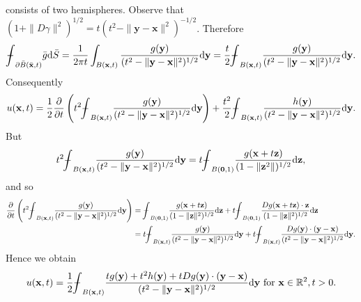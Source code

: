 \begin{sol}
  consists of two hemispheres.
  Observe that $(1+\|D\gamma\|^2)^{1/2} = t(t^2-\|\mathbf{y}-\mathbf{x}\|^2)^{-1/2}$.
  Therefore
  \begin{displaymath}
    \bbint_{\partial\bar{B}(\bar{\mathbf{x}}, t)}\bar{g}\dif\bar{S} = \frac{1}{2\pi t}
    \int_{B(\mathbf{x}, t)} \frac{g(\mathbf{y})}{(t^2-\|\mathbf{y}-\mathbf{x}\|^2)^{1/2}}\dif\mathbf{y}
    = \frac{t}{2}\bbint_{B(\mathbf{x}, t)}\frac{g(\mathbf{y})}{(t^2-\|\mathbf{y}-\mathbf{x}\|^2)^{1/2}}\dif\mathbf{y}.
  \end{displaymath}
  Consequently
  \begin{displaymath}
    u(\mathbf{x}, t) = \frac{1}{2}\frac{\partial}{\partial t}\LP t^2
    \bbint_{B(\mathbf{x}, t)}\frac{g(\mathbf{y})}{(t^2-\|\mathbf{y}-\mathbf{x}\|^2)^{1/2}}\dif\mathbf{y}\RP + \frac{t^2}{2}\bbint_{B(\mathbf{x}, t)}
    \frac{h(\mathbf{y})}{(t^2-\|\mathbf{y}-\mathbf{x}\|^2)^{1/2}}\dif\mathbf{y}.
  \end{displaymath}
  But
  \begin{displaymath}
    t^2\bbint_{B(\mathbf{x}, t)}\frac{g(\mathbf{y})}{(t^2-\|\mathbf{y}-\mathbf{x}\|^2)^{1/2}}\dif\mathbf{y}
    = t\bbint_{B(\mathbf{0}, 1)}\frac{g(\mathbf{x}+t\mathbf{z})}{(1-\|\mathbf{z}^2\|)^{1/2}}\dif\mathbf{z},
  \end{displaymath}
  and so
  \begin{align*}
    \frac{\partial}{\partial t}\LP t^2
    \bbint_{B(\mathbf{x}, t)}\frac{g(\mathbf{y})}{(t^2-\|\mathbf{y}-\mathbf{x}\|^2)^{1/2}}\dif\mathbf{y}\RP &= \bbint_{B(\mathbf{0}, 1)}\frac{g(\mathbf{x}+t\mathbf{z})}{(1-\|\mathbf{z}\|^2)^{1/2}}\dif\mathbf{z} + t\bbint_{B(\mathbf{0}, 1)}\frac{Dg(\mathbf{x}+t\mathbf{z})\cdot\mathbf{z}}{(1-\|\mathbf{z}\|^2)^{1/2}}\dif\mathbf{z} \\
    &= t\bbint_{B(\mathbf{x}, t)}\frac{g(\mathbf{y})}{(t^2-\|\mathbf{y}-\mathbf{x}\|^2)^{1/2}}\dif\mathbf{y} + t\bbint_{B(\mathbf{x}, t)}\frac{Dg(\mathbf{y})\cdot(\mathbf{y}-\mathbf{x})}{(t^2-\|\mathbf{y}-\mathbf{x}\|^2)^{1/2}}\dif\mathbf{y}.
  \end{align*}
  Hence we obtain
  \begin{displaymath}
    u(\mathbf{x}, t) = \frac{1}{2}\bbint_{B(\mathbf{x}, t)}
    \frac{tg(\mathbf{y})+t^2h(\mathbf{y})+tDg(\mathbf{y})\cdot(\mathbf{y}-\mathbf{x})}{(t^2-\|\mathbf{y}-\mathbf{x}\|^2)^{1/2}}\dif\mathbf{y} \text{ for }
    \mathbf{x}\in\mathbb{R}^2, t>0.
  \end{displaymath}
\end{sol}
